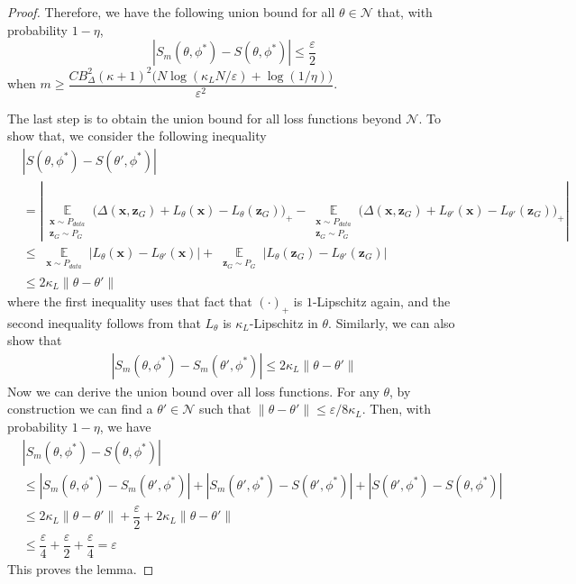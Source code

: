 \begin{proof}
Therefore, we have the following union bound for all $\theta\in\mathcal N$ that, with probability $1-\eta$,
$$
|S_m(\theta,\phi^*)-S(\theta,\phi^*)|\leq \dfrac{\varepsilon}{2}
$$
when $m\geq\dfrac{C B_\Delta^2(\kappa+1)^2 \big(N \log(\kappa_L N/\varepsilon)+\log(1/\eta)\big)}{\varepsilon^2}$.

The last step is to obtain the union bound for all loss functions beyond $\mathcal N$. To show that, we consider the following inequality
\[
\begin{aligned}
&|S(\theta,\phi^*)-S(\theta',\phi^*)|\\
&=|\mathop\mathbb E\limits_{\substack{\mathbf x\sim P_{data}\\ \mathbf z_G\sim P_G}} \big(\Delta(\mathbf x, \mathbf z_G)+ L_{\theta}(\mathbf x)- L_{\theta}(\mathbf z_G)\big)_+
-\mathop\mathbb E\limits_{\substack{\mathbf x\sim P_{data}\\ \mathbf z_G\sim P_G}} \big(\Delta(\mathbf x, \mathbf z_G)+ L_{\theta'}(\mathbf x)- L_{\theta'}(\mathbf z_G)\big)_+|\\
&\leq \mathop\mathbb E\limits_{\substack{\mathbf x\sim P_{data}}}|L_{\theta}(\mathbf x)-L_{\theta'}(\mathbf x)|+\mathop\mathbb E\limits_{\substack{ \mathbf z_G\sim P_G}}|L_{\theta}(\mathbf z_G)-L_{\theta'}(\mathbf z_G)|\\
&\leq 2\kappa_L\|\theta-\theta'\|
\end{aligned}
\]
where the first inequality uses that fact that $(\cdot)_+$ is $1$-Lipschitz again, and the second inequality follows from that $L_\theta$ is $\kappa_L$-Lipschitz in $\theta$.
Similarly, we can also show that
\[
\begin{aligned}
|S_m(\theta,\phi^*)-S_m(\theta',\phi^*)|
\leq 2\kappa_L\|\theta-\theta'\|
\end{aligned}
\]
Now we can derive the union bound over all loss functions. For any $\theta$, by construction we can find a $\theta'\in\mathcal N$ such that $\|\theta-\theta'\|\leq\varepsilon/8\kappa_L$.
Then, with probability $1-\eta$, we have
\[
\begin{aligned}
&|S_m(\theta,\phi^*)-S(\theta,\phi^*)|\\
&\leq|S_m(\theta,\phi^*)-S_m(\theta',\phi^*)|
+|S_m(\theta',\phi^*)-S(\theta',\phi^*)|+|S(\theta',\phi^*)-S(\theta,\phi^*)|\\
&\leq 2\kappa_L\|\theta-\theta'\|+\dfrac{\varepsilon}{2}+2\kappa_L\|\theta-\theta'\|\\
&\leq\dfrac{\varepsilon}{4}+\dfrac{\varepsilon}{2}+\dfrac{\varepsilon}{4}=\varepsilon
\end{aligned}
\]
This proves the lemma.
\end{proof}



